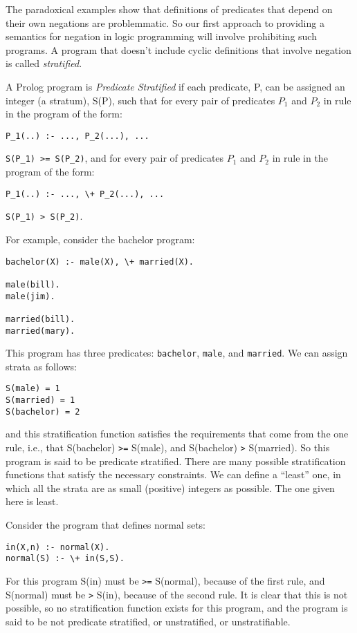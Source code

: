 The paradoxical examples show that definitions of predicates that
depend on their own negations are problemmatic.  So our first approach
to providing a semantics for negation in logic programming will
involve prohibiting such programs.  A program that doesn't include
cyclic definitions that involve negation is called {\em stratified}.

A Prolog program is {\em Predicate Stratified} if each predicate, P,
can be assigned an integer (a stratum), S(P), such that for every pair
of predicates $P_1$ and $P_2$ in rule in the program of the form:
\begin{verbatim}
P_1(..) :- ..., P_2(...), ...
\end{verbatim}
\verb|S(P_1) >= S(P_2)|, and for every pair of predicates $P_1$ and
$P_2$ in rule in the program of the form:
\begin{verbatim}
P_1(..) :- ..., \+ P_2(...), ...
\end{verbatim}
\verb|S(P_1) > S(P_2)|.

For example, consider the bachelor program: 
\begin{verbatim}
bachelor(X) :- male(X), \+ married(X).

male(bill).
male(jim).

married(bill).
married(mary).
\end{verbatim}
This program has three predicates: \verb|bachelor|, \verb|male|, and
\verb|married|.  We can assign strata as follows:
\begin{verbatim}
S(male) = 1
S(married) = 1
S(bachelor) = 2
\end{verbatim}
and this stratification function satisfies the requirements that come
from the one rule, i.e., that S(bachelor) \verb|>=| S(male), and
S(bachelor) \verb|>| S(married).  So this program is said to be
predicate stratified.  There are many possible stratification
functions that satisfy the necessary constraints.  We can define a
``least'' one, in which all the strata are as small (positive)
integers as possible.  The one given here is least.

Consider the program that defines normal sets:
\begin{verbatim}
in(X,n) :- normal(X).
normal(S) :- \+ in(S,S).
\end{verbatim}
For this program S(in) must be \verb|>=| S(normal), because of the
first rule, and S(normal) must be \verb|>| S(in), because of the
second rule.  It is clear that this is not possible, so no
stratification function exists for this program, and the program is
said to be not predicate stratified, or unstratified, or
unstratifiable.

